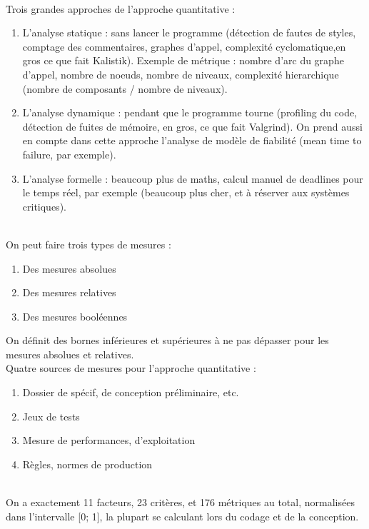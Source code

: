 \hfill\\

Trois grandes approches de l’approche quantitative :
\begin{enumerate}
\item L’analyse statique : sans lancer le programme (détection de fautes de styles, comptage des commentaires, graphes d’appel, complexité cyclomatique,en gros ce que fait Kalistik). Exemple de métrique : nombre d’arc du graphe d’appel, nombre de noeuds, nombre de niveaux, complexité hierarchique (nombre de composants / nombre de niveaux).
\item L’analyse dynamique : pendant que le programme tourne (profiling du code, détection de fuites de mémoire, en gros, ce que fait Valgrind). On prend aussi en compte dans cette approche l’analyse de modèle de fiabilité (mean time to failure, par exemple).
\item L’analyse formelle : beaucoup plus de maths, calcul manuel de deadlines pour le temps réel, par exemple (beaucoup plus cher, et à réserver aux systèmes critiques).
\end{enumerate}

\hfill\\

On peut faire trois types de mesures :
\begin{enumerate}
\item Des mesures absolues
\item Des mesures relatives
\item Des mesures booléennes
\end{enumerate}

On définit des bornes inférieures et supérieures à ne pas dépasser pour les mesures absolues et relatives.\\

Quatre sources de mesures pour l’approche quantitative :
\begin{enumerate}
\item Dossier de spécif, de conception préliminaire, etc.
\item Jeux de tests
\item Mesure de performances, d’exploitation
\item Règles, normes de production
\end{enumerate}

\hfill\\

On a exactement 11 facteurs, 23 critères, et 176 métriques au total, normalisées dans l’intervalle [0; 1], la plupart se calculant lors du codage et de la conception.

